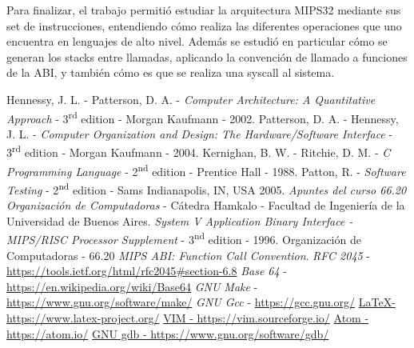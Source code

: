 \hfill

Para finalizar, el trabajo permitió estudiar la arquitectura MIPS32 mediante sus set de instrucciones, entendiendo cómo realiza las diferentes operaciones que uno encuentra en lenguajes de alto nivel. Además se estudió en particular cómo se generan los stacks entre llamadas, aplicando la convención de llamado a funciones de la ABI, y también cómo es que se realiza
una syscall al sistema.

\clearpage
\begin{thebibliography}{10}
	 Hennessy, J. L. - Patterson, D. A. - \emph{Computer Architecture: A Quantitative Approach} - 3\textsuperscript{rd} edition - Morgan Kaufmann - 2002.
	 Patterson, D. A. - Hennessy, J. L. - \emph{Computer Organization and Design: The Hardware/Software Interface} - 3\textsuperscript{rd} edition - Morgan Kaufmann - 2004.
	 Kernighan, B. W. - Ritchie, D. M. - \emph{C Programming Language} - 2\textsuperscript{nd} edition - Prentice Hall - 1988.
	 Patton, R. - \emph{Software Testing} - 2\textsuperscript{nd} edition - Sams Indianapolis, IN, USA 2005.
	 \emph{Apuntes del curso 66.20 Organización de Computadoras} - Cátedra Hamkalo - Facultad de Ingeniería de la Universidad de Buenos Aires.
	 \emph{System V Application Binary Interface - MIPS/RISC Processor Supplement} - 3\textsuperscript{nd} edition - 1996.
     Organización de Computadoras - 66.20 \emph{MIPS ABI: Function Call Convention}.
	 \emph{RFC 2045} - \hyperlink{make}{https://tools.ietf.org/html/rfc2045\#section-6.8}
	 \emph{Base 64} - \hyperlink{make}{https://en.wikipedia.org/wiki/Base64}
	 \emph{GNU Make} - \hyperlink{make}{https://www.gnu.org/software/make/}
	 \emph{GNU Gcc} - \hyperlink{gcc}{https://gcc.gnu.org/}
	\href{https://www.latex-project.org/}{\LaTeX - https://www.latex-project.org/}
	\href{https://vim.sourceforge.io/}{VIM - https://vim.sourceforge.io/}
	\href{https://atom.io/}{Atom - https://atom.io/}
	\href{https://www.gnu.org/software/gdb/}{GNU gdb - https://www.gnu.org/software/gdb/}
\end{thebibliography}
\clearpage

\appendix
